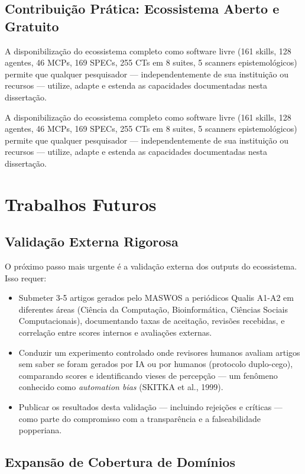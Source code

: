 \subsection{Contribuição Prática: Ecossistema Aberto e Gratuito}

A disponibilização do ecossistema completo como software livre (161 skills, 128 agentes, 46 MCPs, 169 SPECs, 255 CTs em 8 suites, 5 scanners epistemológicos) permite que qualquer pesquisador --- independentemente de sua instituição ou recursos --- utilize, adapte e estenda as capacidades documentadas nesta dissertação.

A disponibilização do ecossistema completo como software livre (161 skills, 128 agentes, 46 MCPs, 169 SPECs, 255 CTs em 8 suites, 5 scanners epistemológicos) permite que qualquer pesquisador --- independentemente de sua instituição ou recursos --- utilize, adapte e estenda as capacidades documentadas nesta dissertação.

\section{Trabalhos Futuros}

\subsection{Validação Externa Rigorosa}

O próximo passo mais urgente é a validação externa dos outputs do ecossistema. Isso requer:

\begin{itemize}
  \item Submeter 3-5 artigos gerados pelo MASWOS a periódicos Qualis A1-A2 em diferentes áreas (Ciência da Computação, Bioinformática, Ciências Sociais Computacionais), documentando taxas de aceitação, revisões recebidas, e correlação entre scores internos e avaliações externas.
  \item Conduzir um experimento controlado onde revisores humanos avaliam artigos sem saber se foram gerados por IA ou por humanos (protocolo duplo-cego), comparando scores e identificando vieses de percepção --- um fenômeno conhecido como \textit{automation bias} (SKITKA et al., 1999).
  \item Publicar os resultados desta validação --- incluindo rejeições e críticas --- como parte do compromisso com a transparência e a falseabilidade popperiana.
\end{itemize}

\subsection{Expansão de Cobertura de Domínios}

